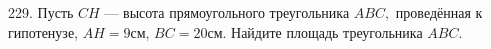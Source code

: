 229. Пусть $CH$ --- высота прямоугольного треугольника $ABC,$ проведённая к гипотенузе, $AH=9$см, $BC=20$см. Найдите площадь треугольника $ABC.$\\
